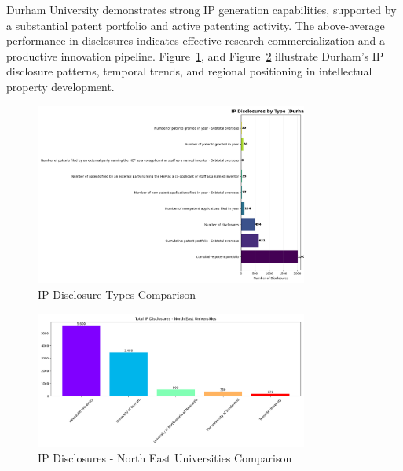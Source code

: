 \documentclass[journal,onecolumn, 10pt,draftclsnofoot]{IEEEtran}
\begin{document}
Durham University demonstrates strong IP generation capabilities, supported by a substantial patent portfolio and active patenting activity. The above-average performance in disclosures indicates effective research commercialization and a productive innovation pipeline. Figure~\ref{fig:ip-disclosure-type}, and Figure~\ref{fig:ip-ne-comparison} illustrate Durham's IP disclosure patterns, temporal trends, and regional positioning in intellectual property development.



\begin{figure}[h]
\centering
\includegraphics[width=0.8\textwidth]{Fig/figure18.ip_disclosure_type.png}
\caption{IP Disclosure Types Comparison}
\label{fig:ip-disclosure-type}
\end{figure}


\begin{figure}[h]
\centering
\includegraphics[width=0.8\textwidth]{Fig/figure20.ip_ne_comparison.png}
\caption{IP Disclosures - North East Universities Comparison}
\label{fig:ip-ne-comparison}
\end{figure}
\end{document}
